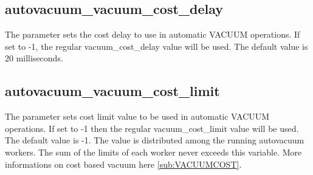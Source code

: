 \subsection{autovacuum\_vacuum\_cost\_delay}
The parameter sets the cost delay to use in automatic VACUUM operations. If set to -1, the regular 
vacuum\_cost\_delay value will be used. The default value is 20 milliseconds. 

\subsection{autovacuum\_vacuum\_cost\_limit}
The parameter sets  cost limit value to be used in automatic VACUUM operations. 
If set to -1 then the regular vacuum\_cost\_limit value will be used. The default value is -1.
The value is distributed among the running autovacuum workers. The sum of the limits of each worker 
never exceeds this variable. More informations on cost based vacuum here \ref{sub:VACUUMCOST}.



